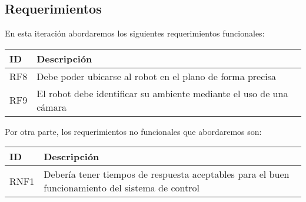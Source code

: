 \subsection{Requerimientos}
En esta iteración abordaremos los siguientes requerimientos funcionales:

\begin{center}
    \begin{tabular} {
        | >{\centering\arraybackslash}m{1cm}
        | >{\centering\arraybackslash}m{13cm} |}
        \hline
            ID & Descripción \\
        \hline
            RF8 & Debe poder ubicarse al robot en el plano de forma precisa \\
        \hline
            RF9 & El robot debe identificar su ambiente mediante el uso de una cámara \\ 
        \hline
    \end{tabular}
\end{center}

    Por otra parte, los requerimientos no funcionales que abordaremos son:

\begin{center}
    \begin{tabular} {
        | >{\centering\arraybackslash}m{1cm}
        | >{\centering\arraybackslash}m{13cm} |}
        \hline
            ID & Descripción \\
        \hline
            RNF1 & Debería tener tiempos de respuesta aceptables para el buen funcionamiento del sistema de control \\
        \hline
    \end{tabular}
\end{center}